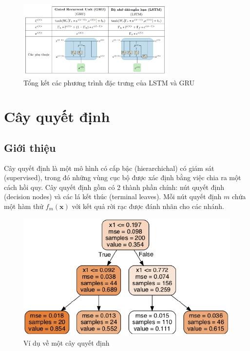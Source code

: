 \begin{figure}[h!]
    \centering
    \includegraphics[width=0.7\textwidth]{images/LSTM/lstm_summary.png}
    \caption{Tổng kết các phương trình đặc trưng của LSTM và GRU}
    \label{fig:lstm_summary}
\end{figure}







\section{Cây quyết định}

\subsection{Giới thiệu}
Cây quyết định là một mô hình có cấp bậc (hierarchichal) có giám sát (supervised), trong đó những vùng cục bộ được xác định bằng việc chia ra một cách hồi quy.
Cây quyết định gồm có 2 thành phần chính: nút quyết định (decision nodes) và các lá kết thúc (terminal leaves).
Mỗi nút quyết định $m$ chứa một hàm thử $f_m(\mathbf{x})$ với kết quả rời rạc được đánh nhãn cho các nhánh.
\begin{figure}[hbpt]
    \centering
    \includegraphics[width=\linewidth]{figures/decision_tree.png}
    \caption{Ví dụ về một cây quyết định}
    \label{fig:decision_tree_example}
\end{figure}

